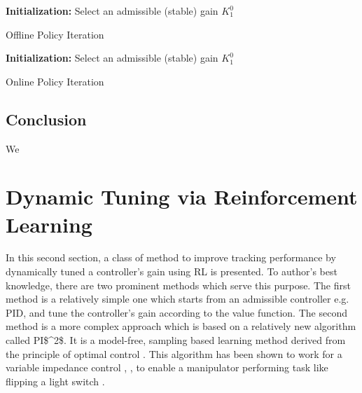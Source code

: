 \begin{algorithm}[H]
	\textbf{Initialization:} Select an admissible (stable) gain $K^0_1$\\
	\label{alg:off_pi}
	\caption{Offline Policy Iteration}
\end{algorithm}

\begin{algorithm}[H]
	\textbf{Initialization:} Select an admissible (stable) gain $K^0_1$\\
	\label{alg:on_pi}
	\caption{Online Policy Iteration}
\end{algorithm}


\subsection{Conclusion}
We

\section{Dynamic Tuning via Reinforcement Learning} \label{sec:dytun}
In this second section, a class of method to improve tracking performance by dynamically tuned a controller's gain using \ac {RL} is presented. To author's best knowledge, there are two prominent methods which serve this purpose. The first method is a relatively simple one which starts from an admissible controller e.g. PID, and tune the controller's gain according to the value function. The second method is a more complex approach which is based on a relatively new algorithm called \ac {PI$^2$}. It is a model-free, sampling based learning method derived from the principle of optimal control \cite{Buchli2010}. This algorithm has been shown to work for a variable impedance control \cite{Buchli6037312}, \cite{buchli2011learning}, \cite{theodorou2010generalized} to enable a manipulator performing task like flipping a light switch \cite{buchli2011learning}.

